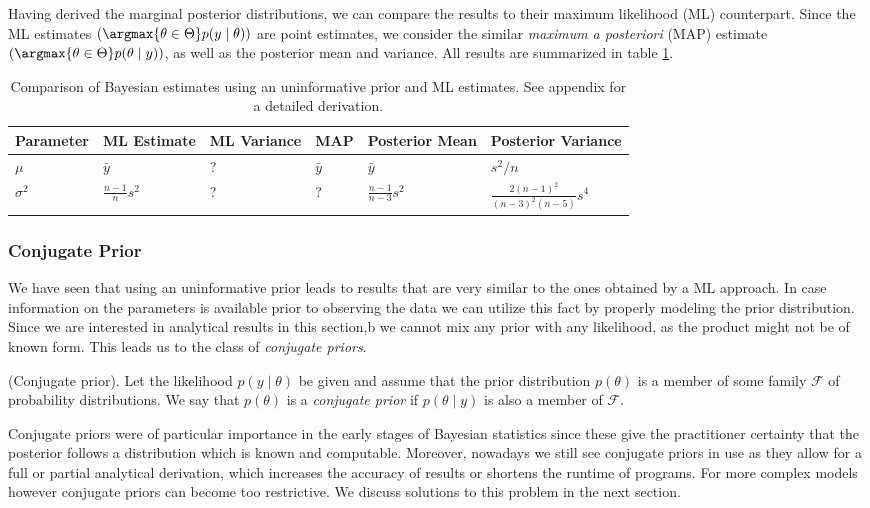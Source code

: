 Having derived the marginal posterior distributions, we can compare the results to their maximum likelihood (ML) counterpart.
Since the ML estimates $\left(\argmax{\theta \in \Theta}p(y \mid \theta)\right)$ are point estimates, we consider the similar \emph{maximum a posteriori} (MAP) estimate $\left(\argmax{\theta \in \Theta} p(\theta \mid y)\right)$, as well as the posterior mean and variance. All results are summarized in table \ref{table:comp_uniform_bay_ml}.

\begin{table}[ht!]
\centering
{\small
 \begin{tabular}{l l l l l l}
 Parameter & ML Estimate & ML Variance & MAP & Posterior Mean & Posterior Variance\\[0.5ex]
 \hline
 $\mu$ & $\bar{y}$ & ? & $\bar{y}$ & $\bar{y}$ & $s^2 / n$\\
 $\sigma^2$ & $\frac{n-1}{n} s^2$ & ? & ? & $\frac{n-1}{n-3} s^2$ & $\frac{2 (n-1)^2}{(n-3)^2 (n-5)} s^4$\\
 \end{tabular}
 }
\caption{\small {Comparison of Bayesian estimates using an uninformative prior and ML estimates. See appendix for a detailed derivation.}}
\label{table:comp_uniform_bay_ml}
\end{table}


\subsubsection*{Conjugate Prior}
We have seen that using an uninformative prior leads to results that are very similar to the ones obtained by a ML approach.
In case information on the parameters is available prior to observing the data we can utilize this fact by properly modeling the prior distribution.
Since we are interested in analytical results in this section,b we cannot mix any prior with any likelihood, as the product might not be of known form.
This leads us to the class of \emph{conjugate priors}.

\begin{definition}{(Conjugate prior).}
Let the likelihood $p(y \mid \theta)$ be given and assume that the prior distribution $p(\theta)$ is a member of some family $\mathcal{F}$ of probability distributions. We say that $p(\theta)$ is a \emph{conjugate prior} if $p(\theta \mid y)$ is also a member of $\mathcal{F}$.
\end{definition}

Conjugate priors were of particular importance in the early stages of Bayesian statistics since these give the practitioner certainty that the posterior follows a distribution which is known and computable. Moreover, nowadays we still see conjugate priors in use as they allow for a full or partial analytical derivation, which increases the accuracy of results or shortens the runtime of programs. For more complex models however conjugate priors can become too restrictive. We discuss solutions to this problem in the next section.

